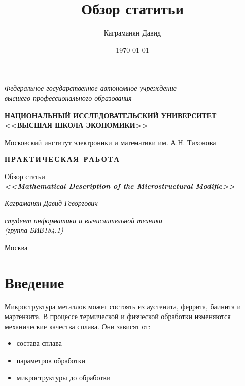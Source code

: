 \documentclass[a4paper, 14pt]{article}
\author{Каграманян Давид}
\title{Обзор статитьи}
\date{\today}
\begin{document}
	\thispagestyle{empty}
	\begin{center}
		\textit{Федеральное государственное автономное учреждение \\
			высшего профессионального образования}
		\vspace{0.5ex}
		
		\textbf{НАЦИОНАЛЬНЫЙ ИССЛЕДОВАТЕЛЬСКИЙ УНИВЕРСИТЕТ \\ <<ВЫСШАЯ ШКОЛА ЭКОНОМИКИ>>}
		
		Московский институт электроники и математики им. А.Н. Тихонова
	\end{center}
	\vspace{13ex}
	
	\begin{center}
		\vspace{13ex}
		\textbf{П\,Р\,А\,К\,Т\,И\,Ч\,Е\,С\,К\,А\,Я\,  \,Р\,А\,Б\,О\,Т\,А}
		\vspace{1ex}
		
		Обзор статьи\\

		\textbf{\textit{<<Mathematical Description of the Microstructural Modific>>}}
		\vfill
		
		\begin{flushright}
			\noindent
			\textit{Каграманян Давид Геворгович}

			\textit{студент информатики и вычислительной техники \\(группа БИВ184.1)}
			
		\end{flushright}
		Москва \the\year{}
	\end{center}
	
	\newpage
	\tableofcontents
	\newpage
	\section{Введение}
	
	Микроструктура металлов может состоять из аустенита, феррита, баинита и мартензита. В процессе термической и физческой обработки изменяются механические качества сплава. Они зависят от:
	 \begin{itemize}
	 
		\item состава сплава
		
		\item параметров обработки
		
		\item микроструктуры до обработки

	\end{itemize}
\end{document}
